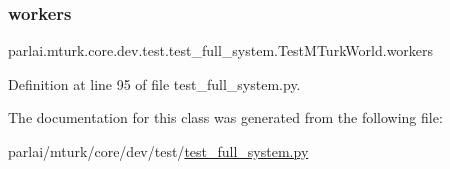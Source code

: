 \subsubsection{\texorpdfstring{workers}{workers}}
{\footnotesize\ttfamily parlai.\+mturk.\+core.\+dev.\+test.\+test\+\_\+full\+\_\+system.\+Test\+M\+Turk\+World.\+workers}



Definition at line 95 of file test\+\_\+full\+\_\+system.\+py.



The documentation for this class was generated from the following file\+:\begin{DoxyCompactItemize}
\item 
parlai/mturk/core/dev/test/\hyperlink{dev_2test_2test__full__system_8py}{test\+\_\+full\+\_\+system.\+py}\end{DoxyCompactItemize}
